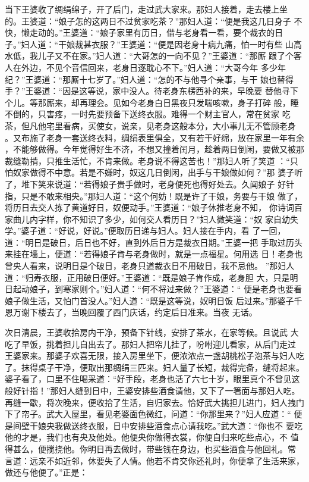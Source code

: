 当下王婆收了绸绢绵子，开了后门，走过武大家来。那妇人接着，走去楼上坐
的。王婆道：“娘子怎的这两日不过贫家吃茶？”那妇人道：“便是我这几日身子
不快，懒走动的。”王婆道：“娘子家里有历日，借与老身看一看，要个裁衣的日
子。”妇人道：“干娘裁甚衣服？”王婆道：“便是因老身十病九痛，怕一时有些
山高水低，我儿子又不在家。”妇人道：“大哥怎的一向不见？”王婆道：“那厮
跟了个客人在外边，不见个音信回来，老身日逐耽心不下。”妇人道：“大哥今年
多少年纪？”王婆道：“那厮十七岁了。”妇人道：“怎的不与他寻个亲事，与干
娘也替得手？”王婆道：“因是这等说，家中没人。待老身东楞西补的来，早晚要
替他寻下个儿。等那厮来，却再理会。见如今老身白日黑夜只发喘咳嗽，身子打碎
般，睡不倒的，只害疼，一时先要预备下送终衣服。难得一个财主官人，常在贫家
吃茶，但凡他宅里看病，买使女，说亲，见老身这般本分，大小事儿无不管顾老身
。又布施了老身一套送终衣料，绸绢表里俱全，又有若干好绵，放在家里一年有余
，不能够做得。今年觉得好生不济，不想又撞着闰月，趁着两日倒闲，要做又被那
裁缝勒掯，只推生活忙，不肯来做。老身说不得这苦也！”那妇人听了笑道
：“只怕奴家做得不中意。若是不嫌时，奴这几日倒闲，出手与干娘做如何？”那
婆子听了，堆下笑来说道：“若得娘子贵手做时，老身便死也得好处去。久闻娘子
好针指，只是不敢来相央。”那妇人道：“这个何妨！既是许了干娘，务要与干娘
做了，将历日去交人拣了黄道好日，奴便动手。”王婆道：“娘子休推老身不知，
你诗词百家曲儿内字样，你不知识了多少，如何交人看历日？”妇人微笑道：“奴
家自幼失学。”婆子道：“好说，好说。”便取历日递与妇人。妇人接在手内，看
了一回，道：“明日是破日，后日也不好，直到外后日方是裁衣日期。”王婆一把
手取过历头来挂在墙上，便道：“若得娘子肯与老身做时，就是一点福星。何用选
日！老身也曾央人看来，说明日是个破日，老身只道裁衣日不用破日，我不忌他。
”那妇人道：“归寿衣服，正用破日便好。”王婆道：“既是娘子肯作成，老身胆
大，只是明日起动娘子，到寒家则个。”妇人道：“何不将过来做？”王婆道：“
便是老身也要看娘子做生活，又怕门首没人。”妇人道：“既是这等说，奴明日饭
后过来。”那婆子千恩万谢下楼去了，当晚回覆了西门庆话，约定后日准来。当夜
无话。

次日清晨，王婆收拾房内干净，预备下针线，安排了茶水，在家等候。且说武
大吃了早饭，挑着担儿自出去了。那妇人把帘儿挂了，吩咐迎儿看家，从后门走过
王婆家来。那婆子欢喜无限，接入房里坐下，便浓浓点一盏胡桃松子泡茶与妇人吃
了。抹得桌子干净，便取出那绸绢三匹来。妇人量了长短，裁得完备，缝将起来。
婆子看了，口里不住喝采道：“好手段，老身也活了六七十岁，眼里真个不曾见这
般好针指！”那妇人缝到日中，王婆安排些酒食请他，又下了一箸面与那妇人吃。
再缝一歇，将次晚来，便收拾了生活，自归家去。恰好武大挑担儿进门，妇人拽门
下了帘子。武大入屋里，看见老婆面色微红，问道：“你那里来？”妇人应道：“
便是间壁干娘央我做送终衣服，日中安排些酒食点心请我吃。”武大道：“你也不
要吃他的才是，我们也有央及他处。他便央你做得衣裳，你便自归来吃些点心，不
值得甚么，便搅挠他。你明日再去做时，带些钱在身边，也买些酒食与他回礼。常
言道：远亲不如近邻，休要失了人情。他若不肯交你还礼时，你便拿了生活来家，
做还与他便了。”正是：

